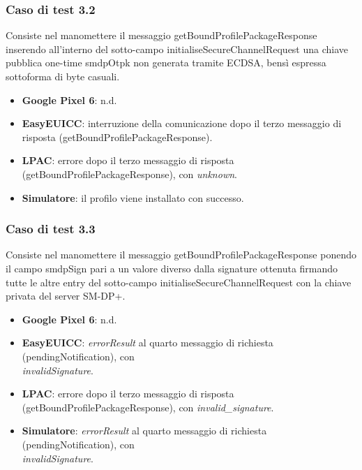 \documentclass[10pt, oneside]{book}
\begin{document}
\subsubsection{Caso di test 3.2}
Consiste nel manomettere il messaggio getBoundProfilePackageResponse inserendo all'interno del sotto-campo initialiseSecureChannelRequest una chiave pubblica one-time smdpOtpk non generata tramite ECDSA, bensì espressa sottoforma di byte casuali.
\begin{itemize}
\item \textbf{Google Pixel 6}: n.d.
\item \textbf{EasyEUICC}: interruzione della comunicazione dopo il terzo messaggio di risposta (getBoundProfilePackageResponse).
\item \textbf{LPAC}: errore dopo il terzo messaggio di risposta (getBoundProfilePackageResponse), con \textit{unknown}.
\item \textbf{Simulatore}: il profilo viene installato con successo.
\end{itemize}

\subsubsection{Caso di test 3.3}
Consiste nel manomettere il messaggio getBoundProfilePackageResponse ponendo il campo smdpSign pari a un valore diverso dalla signature ottenuta firmando tutte le altre entry del sotto-campo initialiseSecureChannelRequest con la chiave privata del server SM-DP+.
\begin{itemize}
\item \textbf{Google Pixel 6}: n.d.
\item \textbf{EasyEUICC}: \textit{errorResult} al quarto messaggio di richiesta (pendingNotification), con\\ \textit{invalidSignature}.
\item \textbf{LPAC}: errore dopo il terzo messaggio di risposta (getBoundProfilePackageResponse), con \textit{invalid\_signature}.
\item \textbf{Simulatore}: \textit{errorResult} al quarto messaggio di richiesta (pendingNotification), con\\ \textit{invalidSignature}.
\end{itemize}
\end{document}

